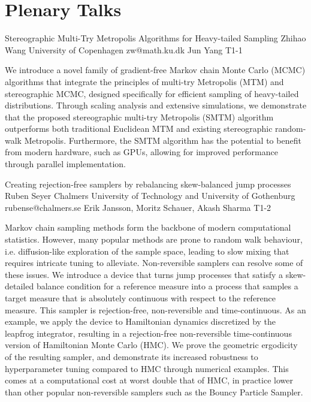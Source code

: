 \chapter{Plenary Talks}
\newpage

\begin{talk}
  {Stereographic Multi-Try Metropolis Algorithms for Heavy-tailed Sampling}%
  {Zhihao Wang}%
  {University of Copenhagen}%
  {zw@math.ku.dk}%
  {Jun Yang}%
  {T1-1}%
			
We introduce a novel family of gradient-free Markov chain Monte Carlo (MCMC) algorithms that integrate the principles of multi-try Metropolis (MTM) and stereographic MCMC, designed specifically for efficient sampling of heavy-tailed distributions. Through scaling analysis and extensive simulations, we demonstrate that the proposed stereographic multi-try Metropolis (SMTM) algorithm outperforms both traditional Euclidean MTM and existing stereographic random-walk Metropolis. Furthermore, the SMTM algorithm has the potential to benefit from modern hardware, such as GPUs, allowing for improved performance through parallel implementation.
\end{talk}

\begin{talk}
  {Creating rejection-free samplers by rebalancing skew-balanced jump processes}%
  {Ruben Seyer}%
  {Chalmers University of Technology and University of Gothenburg}%
  {rubense@chalmers.se}%
  {Erik Jansson, Moritz Schauer, Akash Sharma}%
  {T1-2}%
			
Markov chain sampling methods form the backbone of modern computational statistics.
However, many popular methods are prone to random walk behaviour, i.e.\@{} diffusion-like exploration of the sample space, leading to slow mixing that requires intricate tuning to alleviate.
Non-reversible samplers can resolve some of these issues.
We introduce a device that turns jump processes that satisfy a skew-detailed balance condition for a reference measure into a process that samples a target measure that is absolutely continuous with respect to the reference measure.
This sampler is rejection-free, non-reversible and time-continuous.
As an example, we apply the device to Hamiltonian dynamics discretized by the leapfrog integrator, resulting in a rejection-free non-reversible time-continuous version of Hamiltonian Monte Carlo (HMC).
We prove the geometric ergodicity of the resulting sampler, and demonstrate its increased robustness to hyperparameter tuning compared to HMC through numerical examples.
This comes at a computational cost at worst double that of HMC, in practice lower than other popular non-reversible samplers such as the Bouncy Particle Sampler.
\end{talk}

